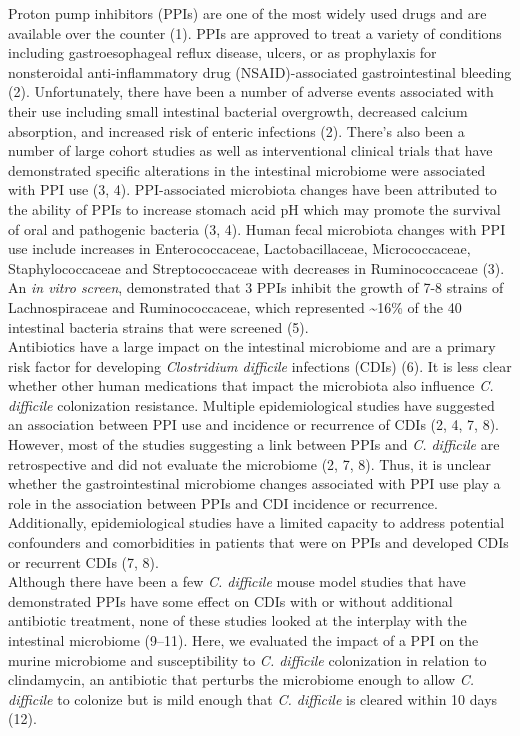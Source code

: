 \documentclass[11pt,]{article}
\begin{document}
Proton pump inhibitors (PPIs) are one of the most widely used drugs and
are available over the counter (1). PPIs are approved to treat a variety
of conditions including gastroesophageal reflux disease, ulcers, or as
prophylaxis for nonsteroidal anti-inflammatory drug (NSAID)-associated
gastrointestinal bleeding (2). Unfortunately, there have been a number
of adverse events associated with their use including small intestinal
bacterial overgrowth, decreased calcium absorption, and increased risk
of enteric infections (2). There's also been a number of large cohort
studies as well as interventional clinical trials that have demonstrated
specific alterations in the intestinal microbiome were associated with
PPI use (3, 4). PPI-associated microbiota changes have been attributed
to the ability of PPIs to increase stomach acid pH which may promote the
survival of oral and pathogenic bacteria (3, 4). Human fecal microbiota
changes with PPI use include increases in Enterococcaceae,
Lactobacillaceae, Micrococcaceae, Staphylococcaceae and Streptococcaceae
with decreases in Ruminococcaceae (3). An \emph{in vitro screen},
demonstrated that 3 PPIs inhibit the growth of 7-8 strains of
Lachnospiraceae and Ruminococcaceae, which represented
\textasciitilde{}16\% of the 40 intestinal bacteria strains that were
screened (5).\\
Antibiotics have a large impact on the intestinal microbiome and are a
primary risk factor for developing \emph{Clostridium difficile}
infections (CDIs) (6). It is less clear whether other human medications
that impact the microbiota also influence \emph{C. difficile}
colonization resistance. Multiple epidemiological studies have suggested
an association between PPI use and incidence or recurrence of CDIs (2,
4, 7, 8). However, most of the studies suggesting a link between PPIs
and \emph{C. difficile} are retrospective and did not evaluate the
microbiome (2, 7, 8). Thus, it is unclear whether the gastrointestinal
microbiome changes associated with PPI use play a role in the
association between PPIs and CDI incidence or recurrence. Additionally,
epidemiological studies have a limited capacity to address potential
confounders and comorbidities in patients that were on PPIs and
developed CDIs or recurrent CDIs (7, 8).\\
Although there have been a few \emph{C. difficile} mouse model studies
that have demonstrated PPIs have some effect on CDIs with or without
additional antibiotic treatment, none of these studies looked at the
interplay with the intestinal microbiome (9--11). Here, we evaluated the
impact of a PPI on the murine microbiome and susceptibility to \emph{C.
difficile} colonization in relation to clindamycin, an antibiotic that
perturbs the microbiome enough to allow \emph{C. difficile} to colonize
but is mild enough that \emph{C. difficile} is cleared within 10 days
(12).
\end{document}
